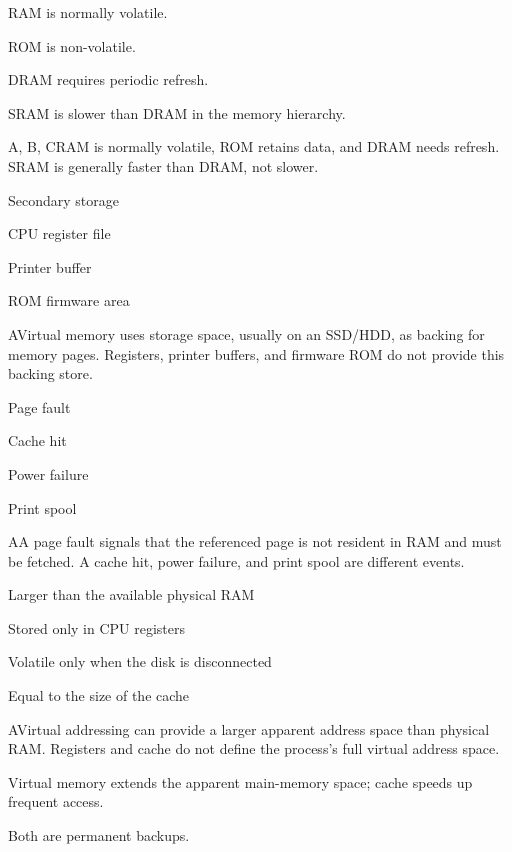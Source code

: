 \begin{enumerate}[label=\textbf{Q\arabic*.}, leftmargin=*]
  {\item RAM is normally volatile.
   \item ROM is non-volatile.
   \item DRAM requires periodic refresh.
   \item SRAM is slower than DRAM in the memory hierarchy.}
  {A, B, C}{RAM is normally volatile, ROM retains data, and DRAM needs refresh. SRAM is generally faster than DRAM, not slower.}
\fi
\ifnum{}
  {\item Secondary storage
   \item CPU register file
   \item Printer buffer
   \item ROM firmware area}
  {A}{Virtual memory uses storage space, usually on an SSD/HDD, as backing for memory pages. Registers, printer buffers, and firmware ROM do not provide this backing store.}
  {\item Page fault
   \item Cache hit
   \item Power failure
   \item Print spool}
  {A}{A page fault signals that the referenced page is not resident in RAM and must be fetched. A cache hit, power failure, and print spool are different events.}
  {\item Larger than the available physical RAM
   \item Stored only in CPU registers
   \item Volatile only when the disk is disconnected
   \item Equal to the size of the cache}
  {A}{Virtual addressing can provide a larger apparent address space than physical RAM. Registers and cache do not define the process's full virtual address space.}
  {\item Virtual memory extends the apparent main-memory space; cache speeds up frequent access.
   \item Both are permanent backups.
}
\end{enumerate}
